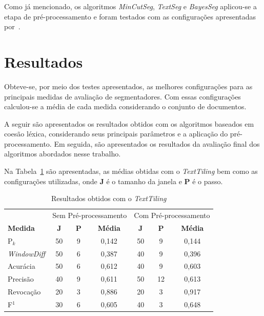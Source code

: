 Como já mencionado, os algoritmos \textit{MinCutSeg}, \textit{TextSeg} e \textit{BayesSeg} aplicou-se a etapa de pré-processamento e foram testados com as configurações apresentadas por~\cite{Eis2008}. 



\section{Resultados}

Obteve-se, por meio dos testes apresentados, as melhores configurações para as principais medidas de avaliação de segmentadores. Com essas configurações calculou-se a média de cada medida considerando o conjunto de documentos.  

A seguir são apresentados os resultados obtidos com os algoritmos baseados em coesão léxica, considerando seus principais parâmetros e a aplicação do pré-processamento. Em seguida, são apresentados os resultados da avaliação final dos algoritmos abordados nesse trabalho.

Na Tabela~\ref{tab:resultadosTT} são apresentadas, as médias obtidas com o \textit{TextTiling} bem como as configurações utilizadas, onde \textbf{J} é o tamanho da janela e \textbf{P} é o passo.


\begin{table}[!h]
	\centering
	\begin{tabular}{|l||c|c|c||c|c|c|} \hline

		& \multicolumn{3}{c||}{Sem Pré-processamento} 
		& \multicolumn{3}{c|}{Com Pré-processamento}\\			

		\textbf{Medida} & 
		\textbf{J} &
		\textbf{P} & 
		\textbf{Média} &
		\textbf{J} &
		\textbf{P} & 
		\textbf{Média} \\	\hline

		P$_k$				& 50 & 9 & 0,142 & 50 & 9  & 0,144 \\ \hline
		\textit{WindowDiff}	& 50 & 6 & 0,387 & 40 & 9  & 0,396 \\ \hline
		Acurácia			& 50 & 6 & 0,612 & 40 & 9  & 0,603 \\ \hline
		Precisão			& 40 & 9 & 0,611 & 50 & 12 & 0,613 \\ \hline
		Revocação			& 20 & 3 & 0,886 & 20 & 3  & 0,917 \\ \hline
		F$^1$				& 30 & 6 & 0,605 & 40 & 3  & 0,648 \\ \hline

	\end{tabular}
	\caption{Resultados obtidos com o \textit{TextTiling}}
	\label{tab:resultadosTT}
\end{table}







